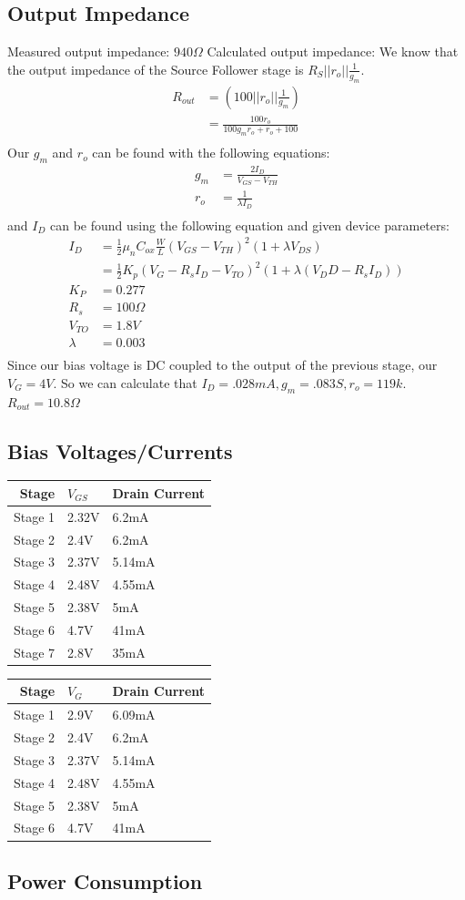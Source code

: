 \documentclass[11pt, twoside, letterpaper]{article}
\begin{document}
\subsection*{Output Impedance}
Measured output impedance: $940 \Omega$
Calculated output impedance:
We know that the output impedance of the Source Follower stage is $R_S || r_o || \frac{1}{g_m}$.
\begin{align*}
	R_{out} &= (100 || r_o || \frac{1}{g_m}) \\
	&= \frac{100r_o}{100g_m r_o + r_o + 100} \\
\end{align*}
Our $g_m$ and $r_o$ can be found with the following equations:
\begin{align*}
	g_m &= \frac{2 I_D}{V_{GS} - V_{TH}} \\
	r_o &= \frac{1}{\lambda I_D} \\
\end{align*}
and $I_D$ can be found using the following equation and given device parameters: 
\begin{align*}
	I_D &= \frac{1}{2} \mu_n C_{ox} \frac{W}{L}(V_{GS} -V_{TH})^2 (1+\lambda V_{DS}) \\
	&= \frac{1}{2}K_p (V_G - R_s I_D - V_{TO})^2 (1+ \lambda (V_DD - R_s I_D)) \\
	K_P &= 0.277 \\
	R_s &= 100 \Omega \\
	V_{TO} &= 1.8 V \\
	\lambda &= 0.003 \\
\end{align*}
Since our bias voltage is DC coupled to the output of the previous stage, our $V_G = 4 V$. 
So we can calculate that $I_D = .028 mA, g_m = .083 S, r_o = 119k$. $R_{out} = 10.8 \Omega$
\subsection*{Bias Voltages/Currents}
\begin{tabular}{|r|l|l|}
\hline
Stage & $V_{GS}$ & Drain Current\\
\hline
Stage 1 &2.32V&6.2mA\\
Stage 2 &2.4V&6.2mA\\
Stage 3 &2.37V&5.14mA\\
Stage 4 &2.48V&4.55mA\\
Stage 5 &2.38V&5mA\\%
Stage 6 &4.7V&41mA\\
Stage 7 &2.8V&35mA\\
\hline
\end{tabular}

\begin{tabular}{|r|l|l|}
\hline
Stage & $V_{G}$ & Drain Current\\
\hline
Stage 1 &2.9V&6.09mA\\
Stage 2 &2.4V&6.2mA\\
Stage 3 &2.37V&5.14mA\\
Stage 4 &2.48V&4.55mA\\
Stage 5 &2.38V&5mA\\
Stage 6 &4.7V&41mA\\
\hline
\end{tabular}


\subsection*{Power Consumption}
\end{document}
